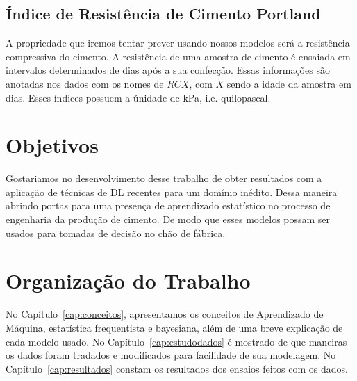 \subsection{Índice de Resistência de Cimento Portland}
\label{sec:rc}
A propriedade que iremos tentar prever usando nossos modelos será a resistência
compressiva do cimento. A resistência de uma amostra de cimento é ensaiada em
intervalos determinados de dias após a sua confecção. Essas informações são
anotadas nos dados com os nomes de $RCX$, com $X$ sendo a idade da amostra em
dias. Esses índices possuem a únidade de kPa, i.e. quilopascal.

\section{Objetivos}
\label{sec:objetivo}

Gostariamos no desenvolvimento desse trabalho de obter resultados com a
aplicação de técnicas de DL recentes para um domínio inédito. Dessa maneira
abrindo portas para uma presença de aprendizado estatístico no processo de
engenharia da produção de cimento. De modo que esses modelos possam ser usados para tomadas de decisão no chão de fábrica.


\section{Organização do Trabalho}
\label{sec:organizacao_trabalho}

No Capítulo~\ref{cap:conceitos}, apresentamos os conceitos de Aprendizado de
Máquina, estatística frequentista e bayesiana, além de uma breve explicação
de cada modelo usado. No Capítulo~\ref{cap:estudodados} é mostrado de que
maneiras os dados foram tradados e modificados para facilidade de sua modelagem.
No Capítulo~\ref{cap:resultados} constam os resultados dos ensaios feitos com os dados. 



